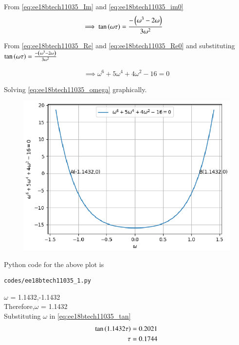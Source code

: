 From \eqref{eq:ee18btech11035_Im} and \eqref{eq:ee18btech11035_im0}
\begin{align}
    \label{eq:ee18btech11035_tan}
    \implies \tan\left(\omega\tau\right)&=\frac{-\left(\omega^3-2\omega\right)}{3\omega^2}
\end{align}

From \eqref{eq:ee18btech11035_Re} and \eqref{eq:ee18btech11035_Re0} and substituting $\tan\left(\omega\tau\right)=\frac{-\left(\omega^3-2\omega\right)}{3\omega^2}$


\begin{align}
    \label{eq:ee18btech11035_omega}
    \implies  \omega^6+5\omega^4+4\omega^2-16=0
\end{align}

Solving \eqref{eq:ee18btech11035_omega} graphically.\\

\begin{figure}[!h]
  \includegraphics[width=\columnwidth]{./figs/ee18btech11035_1.eps}
  \caption{}
  \label{fig:ee18btech11035_1}
\end{figure}
Python code for the above plot is
\begin{lstlisting}
codes/ee18btech11035_1.py
\end{lstlisting}

$\omega$ = 1.1432,-1.1432 \\
Therefore,$\omega$ = 1.1432\\

Substituting $\omega$ in \eqref{eq:ee18btech11035_tan}\\
\begin{align}
    \tan\left(1.1432\tau\right)&=0.2021\\
    \tau&=0.1744
\end{align}

